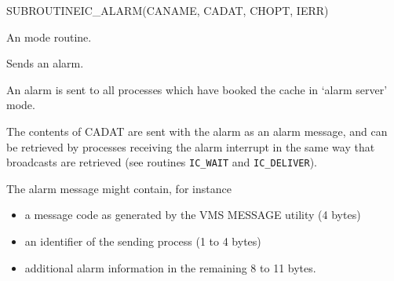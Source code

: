 \begin{routine} %
\subroutine
   {SUBROUTINE}{IC\_ALARM}{(CANAME, CADAT, CHOPT, IERR)}
\begin{overview}
An  \alarm mode routine.

Sends an alarm.
\end{overview}
\begin{argdeflist}
\end{argdeflist}
\begin{describe}

An alarm is sent to all
processes which have booked the cache in `alarm server' mode.

The contents of CADAT are sent with the alarm as an alarm
message, and can
be retrieved by processes receiving the alarm interrupt in the same
way that broadcasts are retrieved (see routines
\verb|IC_WAIT| and \verb|IC_DELIVER|).

The alarm message might contain, for instance
\begin{itemize}
\item a message code
  as generated by the VMS MESSAGE utility (4 bytes) 
\item an identifier
  of the sending process (1 to 4 bytes)
\item additional alarm information in the remaining 8 to 11 bytes.
\end{itemize}

\end{describe}
\begin{options}
\end{options}
\begin{returncodes}
\end{returncodes}
\end{routine}

